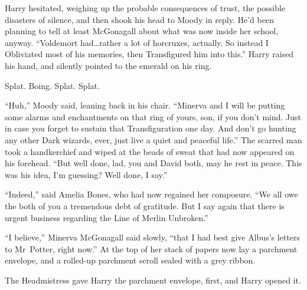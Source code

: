 Harry hesitated, weighing up the probable consequences of trust, the possible disasters of silence, and then shook his head to Moody in reply. He’d been planning to tell at least McGonagall about what was now inside her school, anyway. “Voldemort had…rather a lot of horcruxes, actually. So instead I Obliviated most of his memories, then Transfigured him into this.” Harry raised his hand, and silently pointed to the emerald on his ring.

Splat. Boing. Splat. Splat.

“Huh,” Moody said, leaning back in his chair. “Minerva and I will be putting some alarms and enchantments on that ring of yours, son, if you don’t mind. Just in case you forget to sustain that Transfiguration one day. And don’t go hunting any other Dark wizards, ever, just live a quiet and peaceful life.” The scarred man took a handkerchief and wiped at the beads of sweat that had now appeared on his forehead. “But well done, lad, you and David both, may he rest in peace. This was his idea, I’m guessing? Well done, I say.”

“Indeed,” said Amelia Bones, who had now regained her composure. “We all owe the both of you a tremendous debt of gratitude. But I say again that there is urgent business regarding the Line of Merlin Unbroken.”

“I believe,” Minerva McGonagall said slowly, “that I had best give Albus’s letters to Mr~Potter, right now.” At the top of her stack of papers now lay a parchment envelope, and a rolled-up parchment scroll sealed with a grey ribbon.

The Headmistress gave Harry the parchment envelope, first, and Harry opened it.

\later

